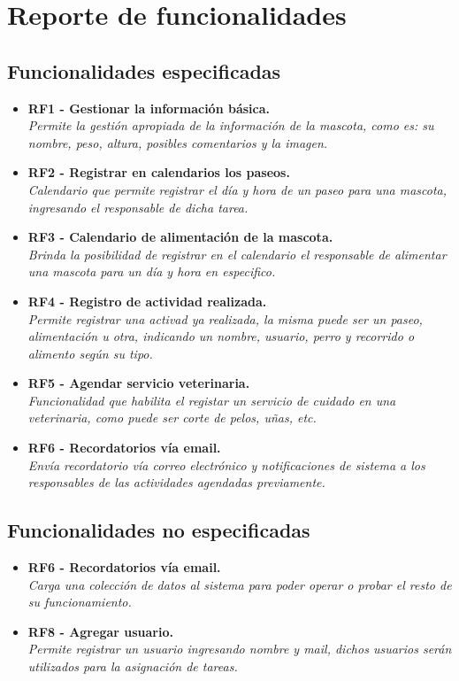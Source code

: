 \section{Reporte de funcionalidades}
\subsection{Funcionalidades especificadas}
\begin{itemize}
    \item \textbf{RF1 - Gestionar la información básica.} \\
    \textit{Permite la gestión apropiada de la información de la mascota, como es:
    su nombre, peso, altura, posibles comentarios y la imagen.}
    \item \textbf{RF2 - Registrar en calendarios los paseos.} \\
    \textit{Calendario que permite registrar el día y hora de un paseo para una mascota, ingresando el responsable de dicha tarea.}
    \item \textbf{RF3 - Calendario de alimentación de la mascota.} \\
    \textit{Brinda la posibilidad de registrar en el calendario el responsable de alimentar una mascota para un día y hora en especifico.}
    \item \textbf{RF4 - Registro de actividad realizada.} \\
    \textit{Permite registrar una activad ya realizada, la misma puede ser un paseo, alimentación u otra, indicando un nombre, usuario, perro y recorrido o alimento según su tipo.}
    \item \textbf{RF5 - Agendar servicio veterinaria.} \\
    \textit{Funcionalidad que habilita el registar un servicio de cuidado en una veterinaria, como puede ser corte de pelos, uñas, etc.}
    \item \textbf{RF6 - Recordatorios vía email.} \\
    \textit{Envía recordatorio vía correo electrónico y notificaciones de sistema a los responsables de las actividades agendadas previamente.}
\end{itemize}

\subsection{Funcionalidades no especificadas}
\begin{itemize}
    \item \textbf{RF6 - Recordatorios vía email.} \\
    \textit{Carga una colección de datos al sistema para poder operar o probar el resto de su funcionamiento.}
    \item \textbf{RF8 - Agregar usuario.} \\
    \textit{Permite registrar un usuario ingresando nombre y mail, dichos usuarios serán utilizados para la asignación de tareas.}
\end{itemize}




